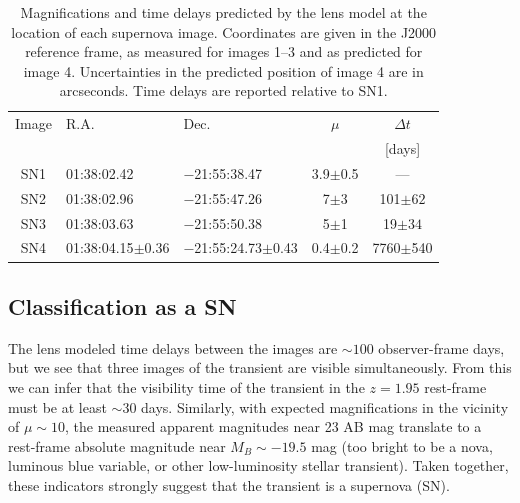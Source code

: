\documentclass[12pt]{article}
\begin{document}
{\begin{table}[tb]
    \centering
    \begin{tabular}{c|l|l|c|c|}
    Image     & R.A. & Dec. & $\mu$ & $\Delta t$ \\
    & & & & [days] \\
\hline 
SN1 & 01:38:02.42     & $-$21:55:38.47         & 3.9$\pm$0.5   &   --- \\
SN2 & 01:38:02.96     & $-$21:55:47.26         & 7$\pm$3     & 101$\pm62$ \\
SN3 & 01:38:03.63     & $-$21:55:50.38         & 5$\pm$1     &  19$\pm34$\\
SN4 & 01:38:04.15$\pm$0.36 & $-$21:55:24.73$\pm$0.43 & 0.4$\pm$0.2 & 7760$\pm$540\\
\hline 
\end{tabular}
    \caption{Magnifications and time delays predicted by the lens model at the location of each supernova image. Coordinates are given in the J2000 reference frame, as measured for images 1--3 and as predicted for image 4.  Uncertainties in the predicted position of image 4 are in arcseconds.  Time delays are reported relative to SN1.}
    \label{tab:snpred}
\end{table}


\subsection*{Classification as a SN}
The lens modeled time delays between the images are $\sim100$ observer-frame days, 
but we see that three images of the transient are visible simultaneously.
From this we can infer that the visibility time of the transient in the $z=1.95$ rest-frame must be at least $\sim$30 days. 
Similarly, with expected magnifications in the vicinity of $\mu\sim10$, the measured apparent magnitudes near 23 AB mag translate to a rest-frame absolute magnitude near $M_B \sim-19.5$ mag (too bright to be a nova, luminous blue variable, or other low-luminosity stellar transient).
Taken together, these indicators strongly suggest that the transient is a supernova (SN). 

}
\end{document}

